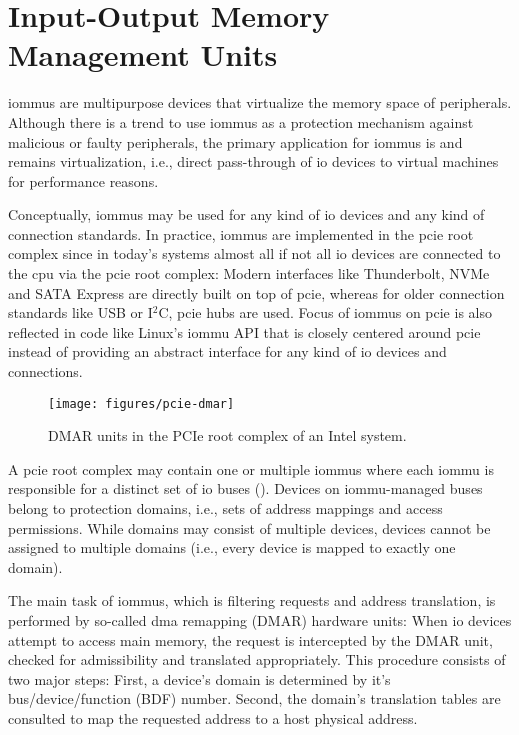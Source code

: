 \section{Input-Output Memory Management Units}
\label{sec:iommus}

\acp{iommu} are multipurpose devices that virtualize the memory space of
peripherals. Although there is a trend to use \acp{iommu} as a protection
mechanism against malicious or faulty peripherals, the primary application for
\acp{iommu} is and remains virtualization, i.e., direct pass-through of \ac{io}
devices to virtual machines for performance reasons.

Conceptually, \acp{iommu} may be used for any kind of \ac{io} devices and any
kind of connection standards. In practice, \acp{iommu} are implemented in the
\ac{pcie} root complex since in today's systems almost all if not all \ac{io}
devices are connected to the \ac{cpu} via the \ac{pcie} root complex: Modern
interfaces like Thunderbolt, NVMe and SATA Express are directly built on top of
\ac{pcie}, whereas for older connection standards like USB or I$^2$C, \ac{pcie}
hubs are used. Focus of \acp{iommu} on \ac{pcie} is also reflected in code like
Linux's \ac{iommu} API that is closely centered around \ac{pcie} instead of
providing an abstract interface for any kind of \ac{io} devices and connections.

\begin{figure}%
    \centering
    \texttt{[image: figures/pcie-dmar]}
    \caption{DMAR units in the PCIe root complex of an Intel system.}
    \label{fig:pcie-dmar}
\end{figure}

A \ac{pcie} root complex may contain one or multiple \acp{iommu} where each
\ac{iommu} is responsible for a distinct set of \ac{io} buses
(). Devices on \ac{iommu}-managed buses belong to protection
domains, i.e., sets of address mappings and access permissions. While domains
may consist of multiple devices, devices cannot be assigned to multiple domains
(i.e., every device is mapped to exactly one domain).

The main task of \acp{iommu}, which is filtering requests and address
translation, is performed by so-called \ac{dma} remapping (DMAR) hardware units:
When \ac{io} devices attempt to access main memory, the request is intercepted
by the DMAR unit, checked for admissibility and translated appropriately. This
procedure consists of two major steps: First, a device's domain is determined by
it's bus/device/function (BDF) number. Second, the domain's translation tables
are consulted to map the requested address to a host physical address.

